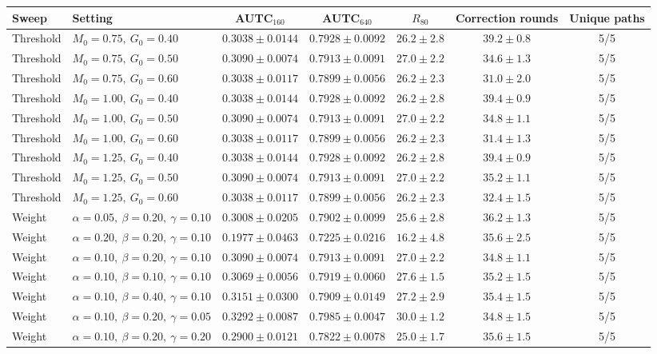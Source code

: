\begin{tabular}{llccccc}
\toprule
Sweep & Setting & AUTC$_{160}$ & AUTC$_{640}$ & $R_{80}$ & Correction rounds & Unique paths \\
\midrule
Threshold & $M_0=0.75,\ G_0=0.40$ & $0.3038 \pm 0.0144$ & $0.7928 \pm 0.0092$ & $26.2 \pm 2.8$ & $39.2 \pm 0.8$ & 5/5 \\
Threshold & $M_0=0.75,\ G_0=0.50$ & $0.3090 \pm 0.0074$ & $0.7913 \pm 0.0091$ & $27.0 \pm 2.2$ & $34.6 \pm 1.3$ & 5/5 \\
Threshold & $M_0=0.75,\ G_0=0.60$ & $0.3038 \pm 0.0117$ & $0.7899 \pm 0.0056$ & $26.2 \pm 2.3$ & $31.0 \pm 2.0$ & 5/5 \\
Threshold & $M_0=1.00,\ G_0=0.40$ & $0.3038 \pm 0.0144$ & $0.7928 \pm 0.0092$ & $26.2 \pm 2.8$ & $39.4 \pm 0.9$ & 5/5 \\
Threshold & $M_0=1.00,\ G_0=0.50$ & $0.3090 \pm 0.0074$ & $0.7913 \pm 0.0091$ & $27.0 \pm 2.2$ & $34.8 \pm 1.1$ & 5/5 \\
Threshold & $M_0=1.00,\ G_0=0.60$ & $0.3038 \pm 0.0117$ & $0.7899 \pm 0.0056$ & $26.2 \pm 2.3$ & $31.4 \pm 1.3$ & 5/5 \\
Threshold & $M_0=1.25,\ G_0=0.40$ & $0.3038 \pm 0.0144$ & $0.7928 \pm 0.0092$ & $26.2 \pm 2.8$ & $39.4 \pm 0.9$ & 5/5 \\
Threshold & $M_0=1.25,\ G_0=0.50$ & $0.3090 \pm 0.0074$ & $0.7913 \pm 0.0091$ & $27.0 \pm 2.2$ & $35.2 \pm 1.1$ & 5/5 \\
Threshold & $M_0=1.25,\ G_0=0.60$ & $0.3038 \pm 0.0117$ & $0.7899 \pm 0.0056$ & $26.2 \pm 2.3$ & $32.4 \pm 1.5$ & 5/5 \\
Weight & $\alpha=0.05,\ \beta=0.20,\ \gamma=0.10$ & $0.3008 \pm 0.0205$ & $0.7902 \pm 0.0099$ & $25.6 \pm 2.8$ & $36.2 \pm 1.3$ & 5/5 \\
Weight & $\alpha=0.20,\ \beta=0.20,\ \gamma=0.10$ & $0.1977 \pm 0.0463$ & $0.7225 \pm 0.0216$ & $16.2 \pm 4.8$ & $35.6 \pm 2.5$ & 5/5 \\
Weight & $\alpha=0.10,\ \beta=0.20,\ \gamma=0.10$ & $0.3090 \pm 0.0074$ & $0.7913 \pm 0.0091$ & $27.0 \pm 2.2$ & $34.8 \pm 1.1$ & 5/5 \\
Weight & $\alpha=0.10,\ \beta=0.10,\ \gamma=0.10$ & $0.3069 \pm 0.0056$ & $0.7919 \pm 0.0060$ & $27.6 \pm 1.5$ & $35.2 \pm 1.5$ & 5/5 \\
Weight & $\alpha=0.10,\ \beta=0.40,\ \gamma=0.10$ & $0.3151 \pm 0.0300$ & $0.7909 \pm 0.0149$ & $27.2 \pm 2.9$ & $35.4 \pm 1.5$ & 5/5 \\
Weight & $\alpha=0.10,\ \beta=0.20,\ \gamma=0.05$ & $0.3292 \pm 0.0087$ & $0.7985 \pm 0.0047$ & $30.0 \pm 1.2$ & $34.8 \pm 1.5$ & 5/5 \\
Weight & $\alpha=0.10,\ \beta=0.20,\ \gamma=0.20$ & $0.2900 \pm 0.0121$ & $0.7822 \pm 0.0078$ & $25.0 \pm 1.7$ & $35.6 \pm 1.5$ & 5/5 \\
\bottomrule
\end{tabular}
